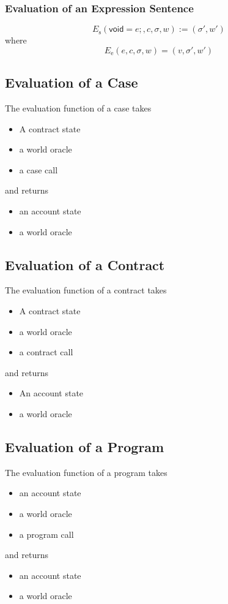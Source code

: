 \documentclass{book}
\newcommand{\evalE}[1]{E_\mathrm{e}\left({#1}\right)}
\newcommand{\evalS}[1]{E_\mathrm{s}\left({#1}\right)}
\newcommand{\expressionsentence}[1]{\mathsf{void}={#1}\mathsf{;}}
\begin{document}
\subsubsection{Evaluation of an Expression Sentence}

\[
\evalS{\boxed{\expressionsentence{e}}, c, \sigma, w} := (\sigma', w')
\]
where
\[
\evalE{\boxed{e}, c, \sigma, w} = (v, \sigma', w')
\]

\subsection{Evaluation of a Case}

The evaluation function of a case takes
\begin{itemize}
\item A contract state
\item a world oracle
\item a case call
\end{itemize}
and returns
\begin{itemize}
\item an account state
\item a world oracle
\end{itemize}

\subsection{Evaluation of a Contract}

The evaluation function of a contract takes
\begin{itemize}
\item A contract state
\item a world oracle
\item a contract call
\end{itemize}
and returns
\begin{itemize}
\item An account state
\item a world oracle
\end{itemize}

\subsection{Evaluation of a Program}

The evaluation function of a program takes
\begin{itemize}
\item an account state
\item a world oracle
\item a program call
\end{itemize}
and returns
\begin{itemize}
\item an account state
\item a world oracle
\end{itemize}
\end{document}

